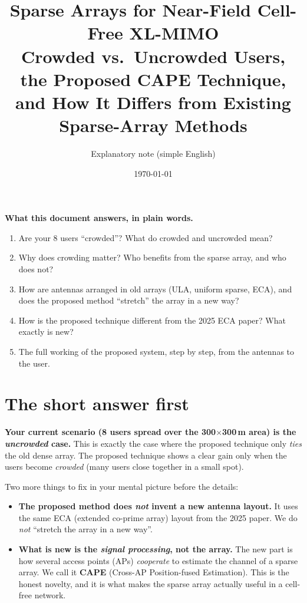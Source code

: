 \documentclass[11pt]{article}
\title{\textbf{Sparse Arrays for Near-Field Cell-Free XL-MIMO}\\[3pt]
\large Crowded vs.\ Uncrowded Users, the Proposed CAPE Technique,\\
and How It Differs from Existing Sparse-Array Methods}
\author{Explanatory note (simple English)}
\date{\today}
\newcommand{\cape}{\textbf{CAPE}}
\begin{document}
\maketitle

\begin{keybox}
\textbf{What this document answers, in plain words.}
\begin{enumerate}[leftmargin=1.4em,itemsep=1pt]
\item Are your 8 users ``crowded''? What do crowded and uncrowded mean?
\item Why does crowding matter? Who benefits from the sparse array, and who does not?
\item How are antennas arranged in old arrays (ULA, uniform sparse, ECA), and does the
      proposed method ``stretch'' the array in a new way?
\item How is the proposed technique different from the 2025 ECA paper? What exactly is new?
\item The full working of the proposed system, step by step, from the antennas to the user.
\end{enumerate}
\end{keybox}

\section{The short answer first}

\begin{keybox}
\textbf{Your current scenario (8 users spread over the 300$\times$300\,m area) is the
\emph{uncrowded} case.} This is exactly the case where the proposed technique only
\emph{ties} the old dense array. The proposed technique shows a clear gain only when the
users become \emph{crowded} (many users close together in a small spot).
\end{keybox}

Two more things to fix in your mental picture before the details:

\begin{itemize}[leftmargin=1.4em,itemsep=2pt]
\item \textbf{The proposed method does \emph{not} invent a new antenna layout.} It uses the
      same ECA (extended co-prime array) layout from the 2025 paper. We do \emph{not}
      ``stretch the array in a new way''.
\item \textbf{What is new is the \emph{signal processing}, not the array.} The new part is how
      several access points (APs) \emph{cooperate} to estimate the channel of a sparse array.
      We call it \cape{} (Cross-AP Position-fused Estimation). This is the honest novelty, and
      it is what makes the sparse array actually useful in a cell-free network.
\end{itemize}
\end{document}
